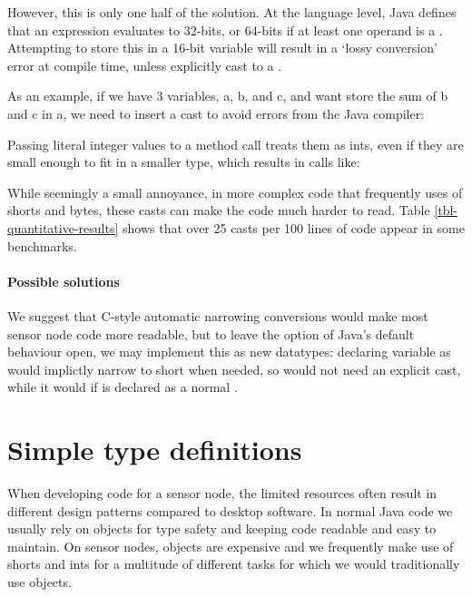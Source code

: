 However, this is only one half of the solution. At the language level, Java defines that an expression evaluates to 32-bits, or 64-bits if at least one operand is a . Attempting to store this in a 16-bit variable will result in a `lossy conversion' error at compile time, unless explicitly cast to a .

As an example, if we have 3  variables, a, b, and c, and want store the sum of b and c in a, we need to insert a cast to avoid errors from the Java compiler:


Passing literal integer values to a method call treats them as ints, even if they are small enough to fit in a smaller type, which results in calls like: 


While seemingly a small annoyance, in more complex code that frequently uses of shorts and bytes, these casts can make the code much harder to read. Table \ref{tbl-quantitative-results} shows that over 25 casts per 100 lines of code appear in some benchmarks.

\paragraph{Possible solutions}

We suggest that C-style automatic narrowing conversions would make most sensor node code more readable, but to leave the option of Java's default behaviour open, we may implement this as new datatypes: declaring variable  as  would implictly narrow to short when needed, so  would not need an explicit cast, while it would if  is declared as a normal .




\section{Simple type definitions}
\label{sec-typedef}
When developing code for a sensor node, the limited resources often result in different design patterns compared to desktop software. In normal Java code we usually rely on objects for type safety and keeping code readable and easy to maintain. On sensor nodes, objects are expensive and we frequently make use of shorts and ints for a multitude of different tasks for which we would traditionally use objects.


